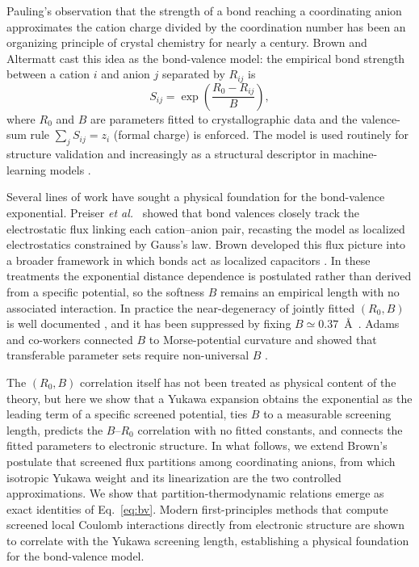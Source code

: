 \documentclass[aps,prmaterials,twocolumn,10pt,superscriptaddress,floatfix]{revtex4-2}
\begin{document}
\maketitle

Pauling's observation that the strength of a bond reaching a coordinating
anion approximates the cation charge divided by the coordination number
\cite{Pauling1929} has been an organizing principle of crystal chemistry
for nearly a century.  Brown and Altermatt \cite{Brown1985} cast this idea
as the bond-valence model: the empirical bond strength between a cation $i$
and anion $j$ separated by $R_{ij}$ is
\begin{equation}\label{eq:bv}
S_{ij}=\exp\!\left(\frac{R_0-R_{ij}}{B}\right),
\end{equation}
where $R_0$ and $B$ are parameters fitted to crystallographic data and the
valence-sum rule $\sum_j S_{ij}=z_i$ (formal charge) is enforced.  The
model is used routinely for structure validation
\cite{Brown2009,Brown2016} and increasingly as a structural descriptor
in machine-learning models \cite{Li2021,Zhang2023,Miller2023}.

Several lines of work have sought a physical foundation for the
bond-valence exponential.  Preiser \emph{et al.}\ \cite{Preiser1999}
showed that bond valences closely
track the electrostatic flux linking each cation--anion pair,
recasting the model as localized electrostatics constrained by
Gauss's law. Brown developed this flux picture into a broader
framework in which bonds act as localized capacitors
\cite{Brown2009,Brown2016}.  In these treatments the exponential
distance dependence is postulated rather than derived from a
specific potential, so the softness $B$ remains an empirical length
with no associated interaction. In practice the near-degeneracy of jointly
fitted $(R_0,B)$ is well documented \cite{Gagn2015}, and it has been suppressed
by fixing $B\simeq0.37$~\AA\ \cite{Brown1985}. Adams and co-workers connected $B$
to Morse-potential curvature and showed that transferable parameter sets require
non-universal $B$ \cite{Adams2001,Chen2017}.

The $(R_0,B)$ correlation itself has not been treated as physical content of
the theory, but here we show that a Yukawa expansion obtains
the exponential as the leading term of a specific screened
potential, ties $B$ to a measurable screening length, predicts the
$B$--$R_0$ correlation with no fitted constants, and connects the
fitted parameters to electronic structure.  In what follows,
we extend Brown's postulate that screened flux partitions among coordinating anions,
from which isotropic Yukawa weight and its linearization are the two controlled
approximations. We show that partition-thermodynamic relations emerge as exact
identities of Eq.~\eqref{eq:bv}. Modern first-principles methods that compute
screened local Coulomb interactions directly from electronic structure
\cite{Aryasetiawan2004,Shih2012} are shown to correlate with the Yukawa screening
length, establishing a physical foundation for the bond-valence model.
\end{document}
